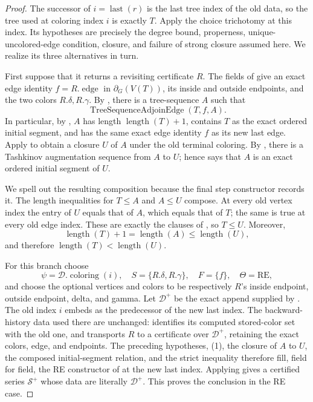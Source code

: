 \begin{proof}
The successor of \(i=\operatorname{last}(r)\) is the last tree index of
the old data, so the tree used at coloring index \(i\) is exactly \(T\).
Apply the choice trichotomy 
at this index.  Its hypotheses are precisely the degree bound,
properness, unique-uncolored-edge condition, closure, and failure of
strong closure assumed here.  We realize its three alternatives in turn.

First suppose that it returns a revisiting certificate \(R\).  The fields
of  give an exact edge identity
\(f=R.\operatorname{edge}\) in \(\partial_G(V(T))\), its inside and
outside endpoints, and the two colors \(R.\delta,R.\gamma\).  By
, there is a tree-sequence
\(A\) such that
\[
             \operatorname{TreeSequenceAdjoinEdge}(T,f,A).       \tag{1}
\]
In particular, by , \(A\) has length
\(\operatorname{length}(T)+1\), contains \(T\) as the exact ordered
initial segment, and has the same exact edge identity \(f\) as its new
last edge.  Apply  to obtain a closure
\(U\) of \(A\) under the old terminal coloring.  By
, there is a Tashkinov augmentation sequence
from \(A\) to \(U\); hence
 says that \(A\)
is an exact ordered initial segment of \(U\).

We spell out the resulting composition because the final step constructor
records it.  The length inequalities for \(T\leq A\) and \(A\leq U\)
compose.  At every old vertex index the entry of \(U\) equals that of
\(A\), which equals that of \(T\); the same is true at every old edge
index.  These are exactly the clauses of
, so \(T\leq U\).  Moreover,
\[
 \operatorname{length}(T)+1=\operatorname{length}(A)
       \leq\operatorname{length}(U),
\]
and therefore \(\operatorname{length}(T)<\operatorname{length}(U)\).

For this branch choose
\[
 \psi=\mathcal D.\operatorname{coloring}(i),\quad
 S=\{R.\delta,R.\gamma\},\quad F=\{f\},\quad
 \Theta=\mathrm{RE},
\]
and choose the optional vertices and colors to be respectively
\(R\)'s inside endpoint, outside endpoint, delta, and gamma.  Let
\(\mathcal D^+\) be the exact append supplied by
.  The old index \(i\) embeds as the
predecessor of the new last index.  The backward-history data used there
are unchanged:  identifies its
computed stored-color set with the old one, and
 transports \(R\) to a
certificate over \(\mathcal D^+\), retaining the exact colors, edge, and
endpoints.  The preceding hypotheses, (1), the closure of \(A\) to
\(U\), the composed initial-segment relation, and the strict inequality
therefore fill, field for field, the RE constructor of
 at the new last index.  Applying
 gives a certified series
\(\mathcal S^+\) whose data are literally \(\mathcal D^+\).  This proves
the conclusion in the RE case.


\end{proof}
